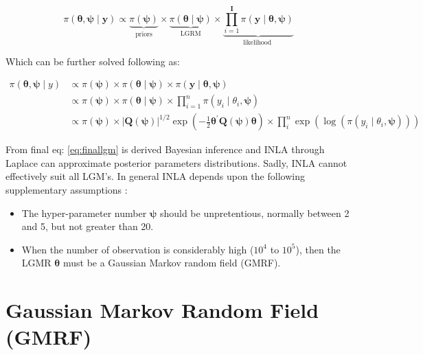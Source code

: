 \documentclass[
  12pt,
  a4paper,
  oneside]{book}
\providecommand{\tightlist}{%
  \setlength{\itemsep}{0pt}\setlength{\parskip}{0pt}}
\theoremstyle{definition}
\theoremstyle{definition}
\theoremstyle{definition}
\theoremstyle{remark}
\begin{document}
\begin{equation}
\pi(\boldsymbol{\theta}, \boldsymbol{\psi} \mid \mathbf{y})\propto  \underbrace{\pi(\boldsymbol{\psi})}_{\text {priors}} \times \underbrace{\pi(\boldsymbol\theta \mid \boldsymbol\psi)}_{\text {LGRM}} \times \underbrace{\prod_{i=1}^{\mathbf{I}} \pi\left(\mathbf{y} \mid \boldsymbol\theta, \boldsymbol{\psi}\right)}_{\text {likelihood }}
\label{eq:formallgm}
\end{equation}

Which can be further solved following \citep{Blangiardo-Cameletti} as:

\begin{equation}
\begin{aligned}
\pi(\boldsymbol{\theta}, \boldsymbol{\psi} \mid y) & \propto \pi(\boldsymbol{\psi}) \times \pi(\boldsymbol{\theta} \mid \boldsymbol{\psi}) \times \pi(\mathbf{y} \mid \boldsymbol{\theta}, \boldsymbol{\psi}) \\
& \propto \pi(\boldsymbol{\psi}) \times \pi(\boldsymbol{\theta} \mid \boldsymbol{\psi}) \times \prod_{i=1}^{n} \pi\left(y_{i} \mid \theta_{i}, \boldsymbol{\psi}\right) \\
& \propto \pi(\boldsymbol{\psi}) \times|\boldsymbol{Q}(\boldsymbol{\psi})|^{1 / 2} \exp \left(-\frac{1}{2} \boldsymbol{\theta}^{\prime} \boldsymbol{Q}(\boldsymbol{\psi}) \boldsymbol{\theta}\right) \times \prod_{i}^{n} \exp \left(\log \left(\pi\left(y_{i} \mid \theta_{i}, \boldsymbol{\psi}\right)\right)\right)
\end{aligned}
\label{eq:finallgm}
\end{equation}

From final eq: \eqref{eq:finallgm} is derived Bayesian inference and INLA through Laplace can approximate posterior parameters distributions. Sadly, INLA cannot effectively suit all LGM's. In general INLA depends upon the following supplementary assumptions \citeyearpar{wang2018bayesian}:

\begin{itemize}
\tightlist
\item
  The hyper-parameter number \(\boldsymbol\psi\) should be unpretentious, normally between 2 and 5, but not greater than 20.
\item
  When the number of observation is considerably high (\(10^4\) to \(10^5\)), then the LGMR \(\boldsymbol\theta\) must be a Gaussian Markov random field (GMRF).
\end{itemize}

\hypertarget{gmrf}{%
\section{Gaussian Markov Random Field (GMRF)}\label{gmrf}}
\end{document}
